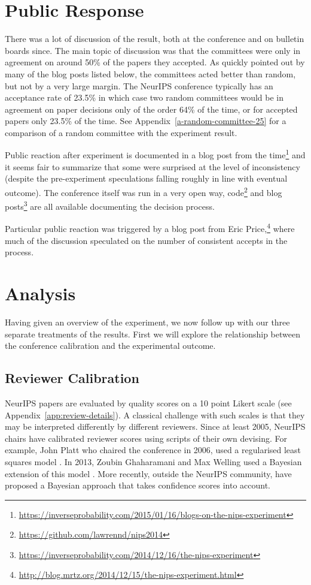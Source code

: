 \documentclass[twoside]{article}
\begin{document}
\section{Public Response}
There was a lot of discussion of the result, both at the
conference and on bulletin boards since. The main topic of discussion
was that the committees were only in agreement on around 50\% of the papers
they accepted. As quickly pointed out by many of the blog posts listed
below, the committees acted better than random, but not by a very large margin. The NeurIPS conference typically has an acceptance rate
of 23.5\% in which case two random committees would be in agreement on
paper decisions only of the order 64\% of the time, or for accepted papers only 
23.5\% of the time. See Appendix~\ref{a-random-committee-25} for a comparison of a random committee with the experiment result.

Public reaction after experiment is documented in a blog post from the time\footnote{\url{https://inverseprobability.com/2015/01/16/blogs-on-the-nips-experiment}} and it seems fair to summarize that some were surprised at the level of inconsistency (despite the pre-experiment speculations falling roughly in line with eventual outcome). The conference itself was run in a very open way, code\footnote{\url{https://github.com/lawrennd/nips2014}} and blog
  posts\footnote{\url{https://inverseprobability.com/2014/12/16/the-nips-experiment}} are all available documenting the decision process.  

Particular public reaction was triggered by a blog post from Eric Price,\footnote{\url{http://blog.mrtz.org/2014/12/15/the-nips-experiment.html}} where much of the discussion speculated on the number of consistent accepts in
the process. 

\section{Analysis}
Having given an overview of the experiment, we now follow up with our
three separate treatments of the results. First we will explore the
relationship between the conference calibration and the experimental
outcome.

\subsection{Reviewer Calibration}
\label{sec:calibration}
NeurIPS papers are evaluated by quality scores on a 10 point Likert
scale (see Appendix~\ref{app:review-details}). A
classical challenge with such scales is that they may be interpreted
differently by different reviewers. Since at least 2005, NeurIPS
chairs have calibrated reviewer scores using scripts of their
own devising. For example, John Platt who chaired the conference in
2006, used a regularised least squares model \citep{Platt-calibration12}. In 2013, Zoubin Ghaharamani
and Max Welling used a Bayesian extension of this model
\citep{Ge-bayesian15}. More recently, outside the NeurIPS community, \cite{MacKay-calibration17} have proposed a Bayesian approach that takes confidence scores into account. 
\end{document}
